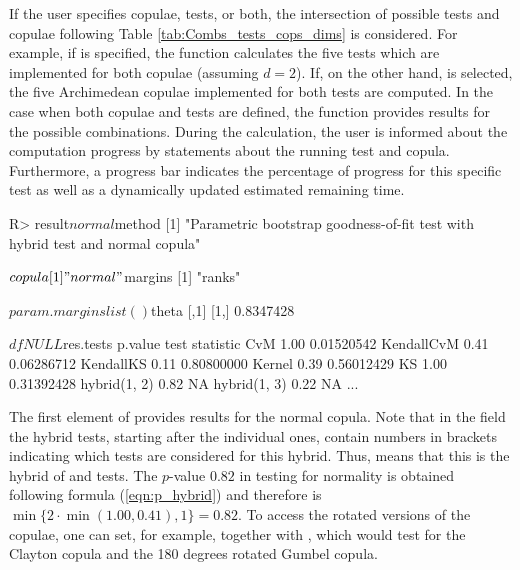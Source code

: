 If the user specifies copulae, tests, or both, the intersection of possible tests and copulae following Table \ref{tab:Combs_tests_cops_dims} is considered. For example, if  is specified, the function calculates the five tests which are implemented for both copulae (assuming $d = 2$). If, on the other hand,  is selected, the five Archimedean copulae implemented for both tests are computed. In the case when both copulae and tests are defined, the function provides results for the possible combinations. During the calculation, the \bk user is informed about the computation progress by statements about the running test and copula. Furthermore, a progress bar indicates the percentage of progress for this specific test as well as a \mycolor dynamically \bk updated estimated remaining time. \mycolor \bk\\
\mycolor
\begin{example}
R> result$normal

$method
[1] "Parametric bootstrap goodness-of-fit test with hybrid test and normal copula"

$copula
[1] "normal"

$margins
[1] "ranks"

$param.margins
list()

$theta
          [,1]
[1,] 0.8347428

$df
NULL

$res.tests
                    p.value   test statistic
CvM                    1.00       0.01520542
KendallCvM             0.41       0.06286712
KendallKS              0.11       0.80800000
Kernel                 0.39       0.56012429
KS                     1.00       0.31392428
hybrid(1, 2)           0.82               NA
hybrid(1, 3)           0.22               NA
...
\end{example}

The first element of  provides results for the normal copula. Note that in the field  the hybrid tests, starting after the individual ones, contain numbers in brackets indicating which tests are considered for this hybrid. Thus,  means that this is the hybrid of  and  tests. The $p$-value $0.82$ in testing for normality is obtained following formula (\ref{eqn:p_hybrid}) and therefore is $\min\{2\cdot\min(1.00, 0.41), 1\} = 0.82$. To access the rotated versions of the copulae, one can set, for example,  together with , which would test for the Clayton copula and the 180 degrees rotated Gumbel copula. \bk

